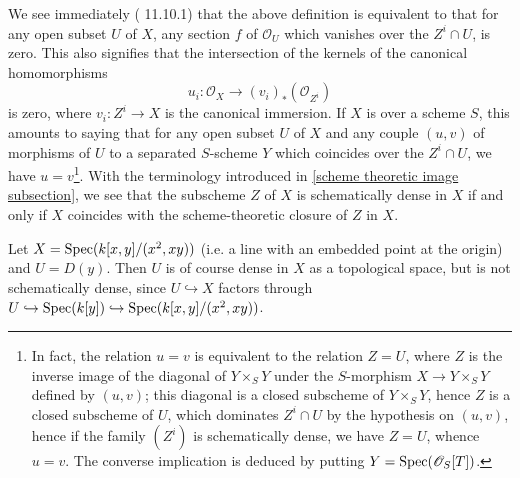 We see immediately (\cite{EGA4-3} 11.10.1) that the above definition is equivalent to that for any open subset $U$ of $X$, any section $f$ of $\mathscr{O}_U$ which vanishes over the $Z^i\cap U$, is zero. This also signifies that the intersection of the kernels of the canonical homomorphisms
\[u_i:\mathscr{O}_X\to (v_i)_*(\mathscr{O}_{Z^i})\]
is zero, where $v_i:Z^i\to X$ is the canonical immersion. If $X$ is over a scheme $S$, this amounts to saying that for any open subset $U$ of $X$ and any couple $(u,v)$ of morphisms of $U$ to a separated $S$-scheme $Y$ which coincides over the $Z^i\cap U$, we have $u=v$\footnote{In fact, the relation $u=v$ is equivalent to the relation $Z=U$, where $Z$ is the inverse image of the diagonal of $Y\times_SY$ under the $S$-morphism $X\to Y\times_SY$ defined by $(u,v)$; this diagonal is a closed subscheme of $Y\times_SY$, hence $Z$ is a closed subscheme of $U$, which dominates $Z^i\cap U$ by the hypothesis on $(u,v)$, hence if the family $(Z^i)$ is schematically dense, we have $Z=U$, whence $u=v$. The converse implication is deduced by putting $Y=\mathrm{Spec}(\mathscr{O}_S[T])$.}. With the terminology introduced in \autoref{scheme theoretic image subsection}, we see that the subscheme $Z$ of $X$ is schematically dense in $X$ if and only if $X$ coincides with the scheme-theoretic closure of $Z$ in $X$.

\begin{example}
Let $X=\mathrm{Spec}(k[x,y]/(x^2,xy))$ (i.e. a line with an embedded point at the origin) and $U=D(y)$. Then $U$ is of course dense in $X$ as a topological space, but is not schematically dense, since $U\hookrightarrow X$ factors through $U\hookrightarrow\mathrm{Spec}(k[y])\hookrightarrow\mathrm{Spec}(k[x,y]/(x^2,xy))$.
\end{example}

